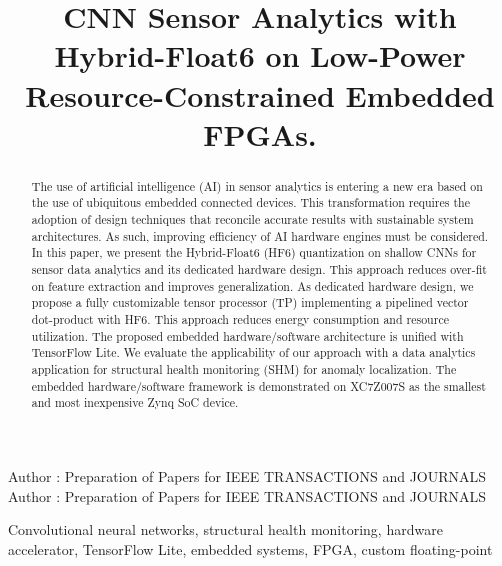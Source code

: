 \title {CNN Sensor Analytics with Hybrid-Float6 on Low-Power Resource-Constrained Embedded FPGAs.}



\markboth
{Author \headeretal: Preparation of Papers for IEEE TRANSACTIONS and JOURNALS}
{Author \headeretal: Preparation of Papers for IEEE TRANSACTIONS and JOURNALS}


\begin{abstract}
The use of artificial intelligence (AI) in sensor analytics is entering a new era based on the use of ubiquitous embedded connected devices. This transformation requires the adoption of design techniques that reconcile accurate results with sustainable system architectures. As such, improving efficiency of AI hardware engines must be considered. In this paper, we present the Hybrid-Float6 (HF6) quantization on shallow CNNs for sensor data analytics and its dedicated hardware design. This approach reduces over-fit on feature extraction and improves generalization. As dedicated hardware design, we propose a fully customizable tensor processor (TP) implementing a pipelined vector dot-product with HF6. This approach reduces energy consumption and resource utilization. The proposed embedded hardware/software architecture is unified with TensorFlow Lite. We evaluate the applicability of our approach with a data analytics application for structural health monitoring (SHM) for anomaly localization. The embedded hardware/software framework is demonstrated on XC7Z007S as the smallest and most inexpensive Zynq SoC device.
\end{abstract}

\begin{keywords}
Convolutional neural networks, structural health monitoring, hardware accelerator, TensorFlow Lite, embedded systems, FPGA, custom floating-point
\end{keywords}

\titlepgskip=-15pt

\maketitle